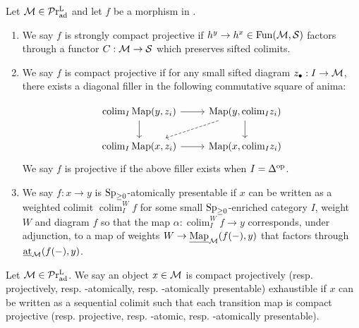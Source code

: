 \documentclass[a4paper,10pt, oneside]{amsart}
\begin{document}
\begin{de}\label{atomicmaps}
	Let $\mathcal{M}\in\mathcal{P}\mathrm{r}_{\mathrm{ad}}^\mathrm{L}$ and let $f$ be a morphism in \mcm. 
	\begin{enumerate}[label=(\arabic*),font=\normalfont]
		\item We say $f$ is strongly compact projective if $h^y\to h^x \in \operatorname{Fun}(\mathcal{M},\mathcal{S})$ factors through a functor $C:\mathcal{M}\to\mathcal{S}$ which preserves sifted colimits.
		\item We say $f$ is compact projective if    for any small sifted diagram
		$z_\bullet : I \to \mathcal{M}$, there exists a diagonal filler in the following commutative square of anima:  
		
		$$%
		\begin{tikzcd}
			{\colimit_{I}\mapp(y,z_i)} \arrow[d] \arrow[r] & {\mapp(y,\colimit_{I}z_i)} \arrow[d] \arrow[ld, dashed] \\
			{\colimit_{I}\mapp(x,z_i)} \arrow[r]           & {\mapp(x,\colimit_{I}z_i)}                             
		\end{tikzcd}$$
		We say $f$ is projective if the above filler exists when $I=\Delta^{\mathrm{op}}$.
		
		
		
		\item We say $f: x \rightarrow y$  is $\operatorname{Sp}_{\geq0}$-atomically presentable if $x$ can be written as a weighted colimit $\operatorname{colim}_I^W f$ for some small $\operatorname{Sp}_{\geq0}$-enriched category $I$, weight $W$ and diagram $f$ so that the map $\alpha: \operatorname{colim}_I^W f \rightarrow y$ corresponds, under adjunction, to a map of weights $W \rightarrow \underline{\operatorname{Map}}_{\mathcal{M}}(f(-), y)$ that factors through  $\underline{\operatorname{at}}_{\mathcal{M}}(f(-), y)$.
	\end{enumerate}
\end{de}
\begin{de}\label{atomicexhau}
	Let $\mathcal{M}\in\mathcal{P}\mathrm{r}_{\mathrm{ad}}^\mathrm{L}$.
	We say an object $x\in\mathcal{M}$ is compact projectively (resp. projectively, %
	 resp. \spgeq-atomically, resp. \spgeq-atomically presentable) exhaustible if $x$ can be written as a sequential colimit such that each transition map is compact projective (resp. projective,%
	 resp. \spgeq-atomic, resp. \spgeq-atomically presentable).
	
\end{de}
\end{document}
